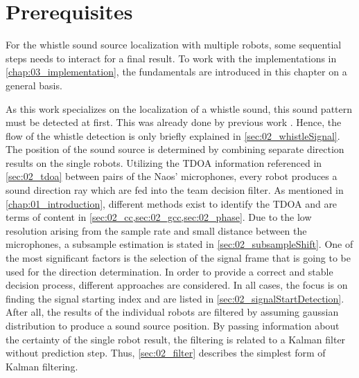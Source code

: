 \chapter{Prerequisites}
\label{chap:02_prerequisites}

For the whistle sound source localization with multiple robots, some
sequential steps needs to interact for a final result.
To work with the implementations in \cref{chap:03_implementation}, the fundamentals
are introduced in this chapter on a general basis.

As this work specializes on the localization of a whistle sound, this sound pattern
must be detected at first.
This was already done by previous work \cite{Hasselbring}.
Hence, the flow of the whistle detection is only briefly explained in \cref{sec:02_whistleSignal}.
The position of the sound source is determined by combining
separate direction results on the single robots.
Utilizing the \ac{TDOA} information referenced in \cref{sec:02_tdoa} between pairs
of the Naos' microphones, every robot produces a sound direction ray which
are fed into the team decision filter.
As mentioned in \cref{chap:01_introduction}, different methods exist to identify the \ac{TDOA}
and are terms of content in \cref{sec:02_cc,sec:02_gcc,sec:02_phase}.
Due to the low resolution arising from the sample rate and small distance between the microphones,
a subsample estimation is stated in \cref{sec:02_subsampleShift}.
One of the most significant factors is the selection of the signal frame that is going to
be used for the direction determination.
In order to provide a correct and stable decision process, different approaches
are considered.
In all cases, the focus is on finding the signal starting index
and are listed in \cref{sec:02_signalStartDetection}.
After all, the results of the individual robots are filtered by assuming
gaussian distribution to produce a sound source position.
By passing information about the certainty of the single robot result, the
filtering is related to a Kalman filter without prediction step.
Thus, \cref{sec:02_filter} describes the simplest form of Kalman filtering.











